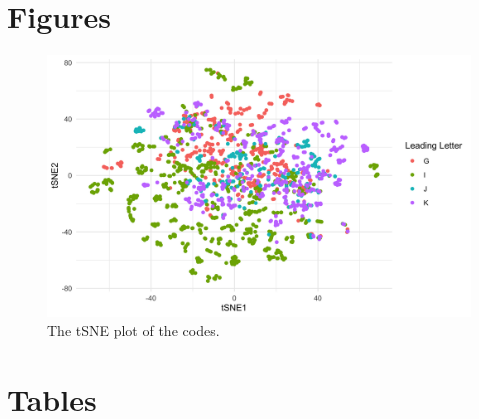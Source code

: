 \documentclass{bmcart}
\begin{document}
\begin{backmatter}


\pagebreak

\section*{Figures}

\begin{figure}[ht!]
  \includegraphics[width=\linewidth]{tsne-plot.png}
  \caption{The tSNE plot of the codes.}
  \label{fig:tsne}
\end{figure}


\pagebreak
\section*{Tables}


\end{backmatter}
\end{document}
